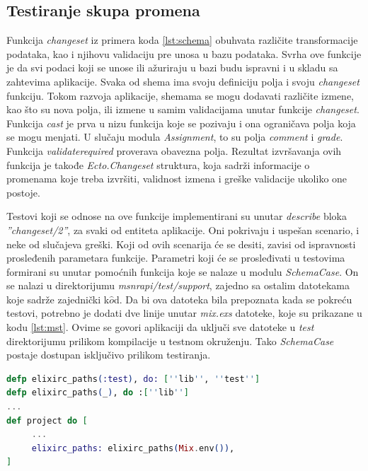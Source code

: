 \documentclass[12pt,oneside]{memoir}
\begin{document}
\subsection{Testiranje skupa promena}
\par Funkcija \emph{changeset} iz primera koda \ref{lst:schema} obuhvata različite transformacije podataka, kao i njihovu validaciju pre unosa u bazu podataka. Svrha ove funkcije je da svi podaci koji se unose ili ažuriraju u bazi budu ispravni i u skladu sa zahtevima aplikacije. Svaka od shema ima svoju definiciju polja i svoju \emph{changeset} funkciju. Tokom razvoja aplikacije, shemama se mogu dodavati različite izmene, kao što su nova polja, ili izmene u samim validacijama unutar funkcije \emph{changeset}. Funkcija \emph{cast} je prva u nizu funkcija koje se pozivaju i ona ograničava polja koja se mogu menjati. U slučaju modula \emph{Assignment}, to su polja \emph{comment} i \emph{grade}. Funkcija \emph{validate{\textunderscore}required} proverava obavezna polja. Rezultat izvršavanja ovih funkcija je takođe \emph{Ecto.Changeset} struktura, koja sadrži informacije o promenama koje treba izvršiti, validnost izmena i greške validacije ukoliko one postoje.
\par Testovi koji se odnose na ove funkcije implementirani su unutar \emph{describe} bloka \emph{''changeset/2''}, za svaki od entiteta aplikacije. Oni pokrivaju i uspešan scenario, i neke od slučajeva greški. Koji od ovih scenarija će se desiti, zavisi od ispravnosti prosleđenih parametara funkcije. Parametri koji će se prosleđivati u testovima formirani su unutar pomoćnih funkcija koje se nalaze u modulu \emph{SchemaCase}. On se nalazi u direktorijumu \emph{msnr{\textunderscore}api/test/support}, zajedno sa ostalim datotekama koje sadrže zajednički k$\hat{o}$d. Da bi ova datoteka bila prepoznata kada se pokreću testovi, potrebno je dodati dve linije unutar \emph{mix.exs} datoteke, koje su prikazane u kodu \ref{lst:mst}. Ovime se govori aplikaciji da uključi sve datoteke u \emph{test} direktorijumu prilikom kompilacije u testnom okruženju. Tako \emph{SchemaCase} postaje dostupan isključivo prilikom testiranja.

\begin{lstlisting}[language=elixir, caption={Uključivanje datoteka iz test direktorijuma pri kompilaciji u testnom okruženju},captionpos=b, label={lst:mst}]
defp elixirc_paths(:test), do: [''lib'', ''test'']
defp elixirc_paths(_), do :[''lib'']
...
def project do [
     ...
     elixirc_paths: elixirc_paths(Mix.env()), 
]
\end{lstlisting}
\end{document}
